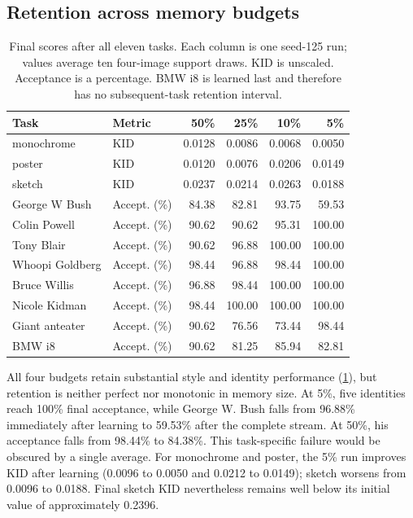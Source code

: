 \subsection{Retention across memory budgets}
\begin{table}[htbp]\centering\small
\begin{tabular}{llrrrr}\toprule
Task & Metric & 50\% & 25\% & 10\% & 5\%\\\midrule
monochrome & KID & 0.0128 & 0.0086 & 0.0068 & 0.0050\\
poster & KID & 0.0120 & 0.0076 & 0.0206 & 0.0149\\
sketch & KID & 0.0237 & 0.0214 & 0.0263 & 0.0188\\
George W Bush & Accept. (\%) & 84.38 & 82.81 & 93.75 & 59.53\\
Colin Powell & Accept. (\%) & 90.62 & 90.62 & 95.31 & 100.00\\
Tony Blair & Accept. (\%) & 90.62 & 96.88 & 100.00 & 100.00\\
Whoopi Goldberg & Accept. (\%) & 98.44 & 96.88 & 98.44 & 100.00\\
Bruce Willis & Accept. (\%) & 96.88 & 98.44 & 100.00 & 100.00\\
Nicole Kidman & Accept. (\%) & 98.44 & 100.00 & 100.00 & 100.00\\
Giant anteater & Accept. (\%) & 90.62 & 76.56 & 73.44 & 98.44\\
BMW i8 & Accept. (\%) & 90.62 & 81.25 & 85.94 & 82.81\\
\bottomrule\end{tabular}
\caption{Final scores after all eleven tasks. Each column is one seed-125 run; values average ten four-image support draws. KID is unscaled. Acceptance is a percentage. BMW i8 is learned last and therefore has no subsequent-task retention interval.}\label{tab:sit_final}
\end{table}

All four budgets retain substantial style and identity performance (\cref{tab:sit_final}), but retention is neither perfect nor monotonic in memory size. At 5\%, five identities reach 100\% final acceptance, while George W. Bush falls from 96.88\% immediately after learning to 59.53\% after the complete stream. At 50\%, his acceptance falls from 98.44\% to 84.38\%. This task-specific failure would be obscured by a single average. For monochrome and poster, the 5\% run improves KID after learning (0.0096 to 0.0050 and 0.0212 to 0.0149); sketch worsens from 0.0096 to 0.0188. Final sketch KID nevertheless remains well below its initial value of approximately 0.2396.

